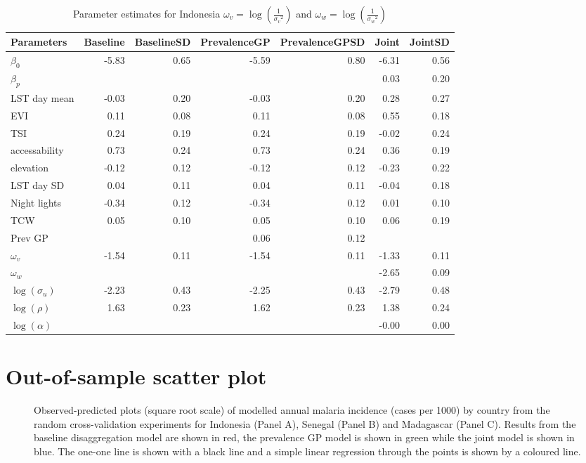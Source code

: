 \documentclass[10pt,a4]{article}
\begin{document}
\begin{table}[ht]
\centering
\begin{tabular}{lrrrrrr}
  \hline
Parameters & Baseline & BaselineSD & PrevalenceGP & PrevalenceGPSD & Joint & JointSD \\ 
  \hline
$\beta_0$ & -5.83 & 0.65 & -5.59 & 0.80 & -6.31 & 0.56 \\ 
  $\beta_p$ &  &  &  &  & 0.03 & 0.20 \\ 
  LST day mean & -0.03 & 0.20 & -0.03 & 0.20 & 0.28 & 0.27 \\ 
  EVI & 0.11 & 0.08 & 0.11 & 0.08 & 0.55 & 0.18 \\ 
  TSI & 0.24 & 0.19 & 0.24 & 0.19 & -0.02 & 0.24 \\ 
  accessability & 0.73 & 0.24 & 0.73 & 0.24 & 0.36 & 0.19 \\ 
  elevation & -0.12 & 0.12 & -0.12 & 0.12 & -0.23 & 0.22 \\ 
  LST day SD & 0.04 & 0.11 & 0.04 & 0.11 & -0.04 & 0.18 \\ 
  Night lights & -0.34 & 0.12 & -0.34 & 0.12 & 0.01 & 0.10 \\ 
  TCW & 0.05 & 0.10 & 0.05 & 0.10 & 0.06 & 0.19 \\ 
  Prev GP &  &  & 0.06 & 0.12 &  &  \\ 
  $\omega_v$ & -1.54 & 0.11 & -1.54 & 0.11 & -1.33 & 0.11 \\ 
  $\omega_w$ &  &  &  &  & -2.65 & 0.09 \\ 
  $\log(\sigma_u)$ & -2.23 & 0.43 & -2.25 & 0.43 & -2.79 & 0.48 \\ 
  $\log(\rho)$ & 1.63 & 0.23 & 1.62 & 0.23 & 1.38 & 0.24 \\ 
  $\log(\alpha)$ &  &  &  &  & -0.00 & 0.00 \\ 
   \hline
\end{tabular}
\label{parsidn}
\caption{Parameter estimates for Indonesia $\omega_v = \log\left(\frac{1}{{\sigma_v}^2}\right)$ and $\omega_w = \log\left(\frac{1}{{\sigma_w}^2}\right)$} 
\end{table}


\clearpage
\section{Out-of-sample scatter plot}



\begin{figure}
\caption{\label{randompredobspolyfacet} 
Observed-predicted plots (square root scale) of modelled annual malaria incidence (cases per 1000) by country from the random cross-validation experiments for Indonesia (Panel A), Senegal (Panel B) and Madagascar (Panel C). 
Results from the baseline disaggregation model are shown in red, the prevalence GP model is shown in green while the joint model is shown in blue.
The one-one line is shown with a black line and a simple linear regression through the points is shown by a coloured line.
}

\end{figure}
\end{document}
